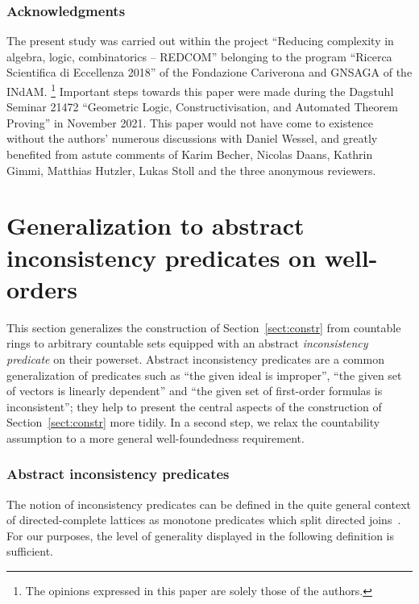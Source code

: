 \documentclass[envcountsect,envcountsame,runningheads]{llncs}
\renewcommand{\_}{\mathpunct{.}\,}
\begin{document}
\color{black}

\subsubsection{Acknowledgments}
The present study was carried out within the project ``Reducing complexity in
algebra, logic, combinatorics -- REDCOM'' belonging to the program ``Ricerca
Scientifica di Eccellenza 2018'' of the Fondazione Cariverona and GNSAGA of the INdAM.%
\footnote{The opinions expressed in this paper are solely those of the
authors.} Important steps towards this paper were made
during the Dagstuhl Seminar 21472 ``Geometric Logic, Constructivisation, and
Automated Theorem Proving'' in November 2021. This paper would not have come to
existence without the authors' numerous discussions with Daniel Wessel, and
greatly benefited from astute comments of Karim Becher, Nicolas Daans, Kathrin Gimmi, Matthias Hutzler,
Lukas Stoll and the three anonymous reviewers.


\appendix

\section{Generalization to abstract inconsistency predicates on well-orders}
\label{sect:inc-wf}

This section generalizes the construction of Section~\ref{sect:constr} from
countable rings to arbitrary countable sets equipped with an abstract
\emph{inconsistency predicate} on their powerset. Abstract inconsistency
predicates are a common generalization of predicates such as ``the given ideal is
improper'', ``the given set of vectors is linearly dependent'' and ``the given
set of first-order formulas is inconsistent''; they help to present the
central aspects of the construction of Section~\ref{sect:constr} more tidily.
In a second step, we relax the countability assumption to a more general
well-foundedness requirement.


\subsubsection{Abstract inconsistency predicates}

The notion of inconsistency predicates can be defined in the quite general
context of directed-complete lattices as monotone predicates which split
directed joins~\cite{schuster-wessel:jacincpred}. For our purposes, the level of generality displayed in the
following definition is sufficient.
\end{document}
